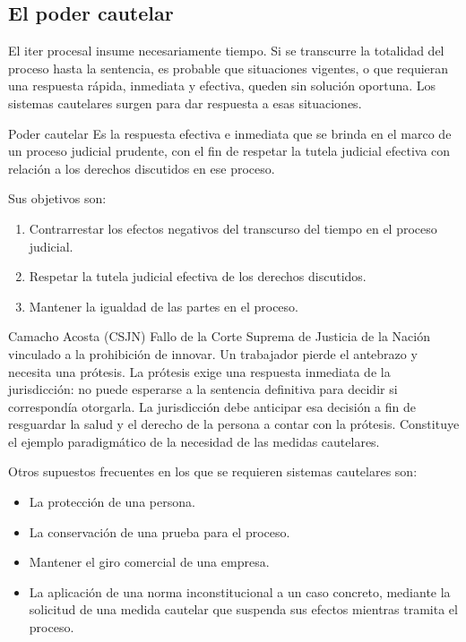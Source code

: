 \documentclass[12pt,oneside]{book}
\begin{document}
\subsection{El poder cautelar}

El iter procesal insume necesariamente tiempo. Si se transcurre la totalidad del proceso hasta la sentencia, es probable que situaciones vigentes, o que requieran una respuesta rápida, inmediata y efectiva, queden sin solución oportuna. Los sistemas cautelares surgen para dar respuesta a esas situaciones.

\begin{definition}{Poder cautelar}
Es la respuesta efectiva e inmediata que se brinda en el marco de un proceso judicial prudente, con el fin de respetar la tutela judicial efectiva con relación a los derechos discutidos en ese proceso.
\end{definition}

Sus objetivos son:
\begin{enumerate}
    \item Contrarrestar los efectos negativos del transcurso del tiempo en el proceso judicial.
    \item Respetar la tutela judicial efectiva de los derechos discutidos.
    \item Mantener la igualdad de las partes en el proceso.
\end{enumerate}

\begin{example}{Camacho Acosta (CSJN)}
Fallo de la Corte Suprema de Justicia de la Nación vinculado a la prohibición de innovar. Un trabajador pierde el antebrazo y necesita una prótesis. La prótesis exige una respuesta inmediata de la jurisdicción: no puede esperarse a la sentencia definitiva para decidir si correspondía otorgarla. La jurisdicción debe anticipar esa decisión a fin de resguardar la salud y el derecho de la persona a contar con la prótesis. Constituye el ejemplo paradigmático de la necesidad de las medidas cautelares.
\end{example}

Otros supuestos frecuentes en los que se requieren sistemas cautelares son:
\begin{itemize}
    \item La protección de una persona.
    \item La conservación de una prueba para el proceso.
    \item Mantener el giro comercial de una empresa.
    \item La aplicación de una norma inconstitucional a un caso concreto, mediante la solicitud de una medida cautelar que suspenda sus efectos mientras tramita el proceso.
\end{itemize}
\end{document}
